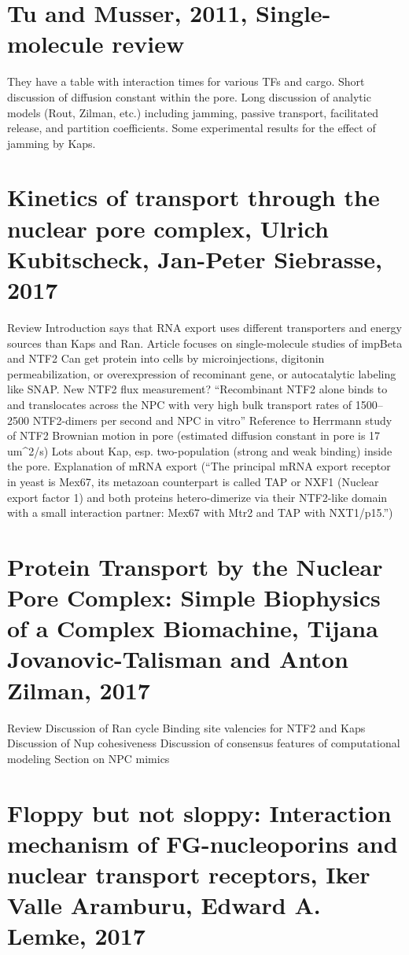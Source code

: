 \section{Tu and Musser, 2011, Single-molecule review}

They have a table with interaction times for various TFs and cargo.
Short discussion of diffusion constant within the pore.
Long discussion of analytic models (Rout, Zilman, etc.) including jamming, passive transport, facilitated release, and partition coefficients.
Some experimental results for the effect of jamming by Kaps.

\section{Kinetics of transport through the nuclear pore complex, Ulrich Kubitscheck, Jan-Peter Siebrasse, 2017}

Review
Introduction says that RNA export uses different transporters and energy sources than Kaps and Ran.
Article focuses on single-molecule studies of impBeta and NTF2
Can get protein into cells by microinjections, digitonin permeabilization, or overexpression of recominant gene, or autocatalytic labeling like SNAP.
New NTF2 flux measurement? ``Recombinant NTF2 alone binds to and translocates across the NPC with very high bulk transport rates of 1500–2500 NTF2-dimers per second and NPC in vitro''
Reference to Herrmann study of NTF2 Brownian motion in pore (estimated diffusion constant in pore is 17 um^2/s)
Lots about Kap, esp. two-population (strong and weak binding) inside the pore.
Explanation of mRNA export (``The principal mRNA export receptor in yeast is Mex67, its metazoan counterpart is called TAP or NXF1 (Nuclear export factor 1) and both proteins hetero-dimerize via their NTF2-like domain with a small interaction partner: Mex67 with Mtr2 and TAP with NXT1/p15.'')

\section{Protein Transport by the Nuclear Pore Complex: Simple Biophysics of a Complex Biomachine, Tijana Jovanovic-Talisman and Anton Zilman, 2017}

Review
Discussion of Ran cycle
Binding site valencies for NTF2 and Kaps
Discussion of Nup cohesiveness
Discussion of consensus features of computational modeling
Section on NPC mimics

\section{Floppy but not sloppy: Interaction mechanism of FG-nucleoporins and nuclear transport receptors, Iker Valle Aramburu, Edward A. Lemke, 2017}

